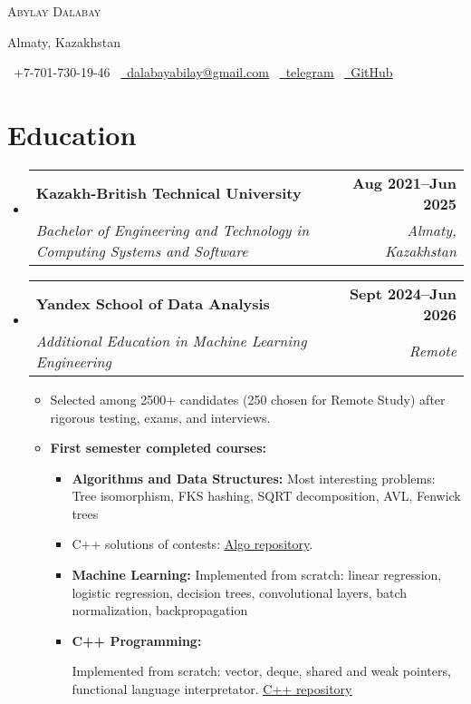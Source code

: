 \documentclass[letterpaper,11pt]{article}
\makeatletter
\newcommand{\resumeItem}[1]{
  \item\small{
    {#1 \vspace{-2pt}}
  }
}
\newcommand{\resumeSubheading}[4]{
  \vspace{-2pt}\item
    \begin{tabular*}{1.0\textwidth}[t]{l@{\extracolsep{\fill}}r}
      \textbf{#1} & \textbf{\small #2} \\
      \emph{\small#3} & \emph{\small #4} \\
    \end{tabular*}\vspace{-7pt}
}
\newcommand{\resumeSubHeadingListStart}{\begin{itemize}[leftmargin=0.0in, label={}]}
\newcommand{\resumeSubHeadingListEnd}{\end{itemize}}
\newcommand{\resumeItemListStart}{\begin{itemize}}
\newcommand{\resumeItemListEnd}{\end{itemize}\vspace{-5pt}}
\makeatother
\begin{document}
\begin{center}
    {\Huge \scshape Abylay Dalabay} \par \vspace{1pt}
    Almaty, Kazakhstan \par \vspace{1pt}
    \small \raisebox{-0.1\height}\faPhone\ +7-701-730-19-46~
    \href{mailto:dalabayabilay@gmail.com}{\raisebox{-0.2\height}\faEnvelope\ \underline{dalabayabilay@gmail.com}}~
    \href{https://t.me/TochkaMikelya}{\raisebox{-0.2\height}\faTelegram\ \underline{telegram}}~
    \href{https://github.com/AbylayDalabay}{\raisebox{-0.2\height}\faGithub\ \underline{GitHub}}~
\end{center}

\section{Education}
  \resumeSubHeadingListStart
    \resumeSubheading
      {Kazakh-British Technical University}{Aug 2021--Jun 2025}
      {Bachelor of Engineering and Technology in Computing Systems and Software}{Almaty, Kazakhstan}
  \resumeSubHeadingListEnd

\resumeSubHeadingListStart
    \resumeSubheading
      {Yandex School of Data Analysis}{Sept 2024--Jun 2026}
      {Additional Education in Machine Learning Engineering}{Remote}
      \resumeItemListStart
        \resumeItem{Selected among 2500+ candidates (250 chosen for Remote Study) after rigorous testing, exams, and interviews.}
        \vspace{4pt} %
        \resumeItem{\textbf{First semester completed courses:}}
        \vspace{2pt} %
        \resumeItemListStart
          \resumeItem{\textbf{Algorithms and Data Structures:}  
          Most interesting problems: Tree isomorphism, FKS hashing, SQRT decomposition, AVL, Fenwick trees }
          \resumeItem{C++ solutions of contests: \href{https://github.com/AbylayDalabay/algo-ysda}{\underline{Algo repository}}.}
          \vspace{4pt} %
          \resumeItem{\textbf{Machine Learning:}  
          Implemented from scratch: linear regression, logistic regression, decision trees, convolutional layers, batch normalization, backpropagation}
          \vspace{4pt} %
          \resumeItem{\textbf{C++ Programming:}}
          Implemented from scratch: vector, deque, shared and weak pointers, functional language interpretator. \href{https://github.com/AbylayDalabay/cpp_ysda}{\underline{C++ repository}}
        \resumeItemListEnd
      \resumeItemListEnd
  \resumeSubHeadingListEnd
\end{document}
